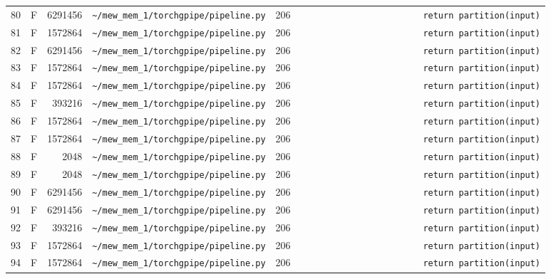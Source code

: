 \documentclass{article}
\begin{document}
\begin{longtable}{r l r p{6.5cm} r p{7.0cm}}
80 & F & 6291456 & \lstinline|~/mew_mem_1/torchgpipe/pipeline.py| & 206 & \lstinline|                        return partition(input)| \\
81 & F & 1572864 & \lstinline|~/mew_mem_1/torchgpipe/pipeline.py| & 206 & \lstinline|                        return partition(input)| \\
82 & F & 6291456 & \lstinline|~/mew_mem_1/torchgpipe/pipeline.py| & 206 & \lstinline|                        return partition(input)| \\
83 & F & 1572864 & \lstinline|~/mew_mem_1/torchgpipe/pipeline.py| & 206 & \lstinline|                        return partition(input)| \\
84 & F & 1572864 & \lstinline|~/mew_mem_1/torchgpipe/pipeline.py| & 206 & \lstinline|                        return partition(input)| \\
85 & F & 393216 & \lstinline|~/mew_mem_1/torchgpipe/pipeline.py| & 206 & \lstinline|                        return partition(input)| \\
86 & F & 1572864 & \lstinline|~/mew_mem_1/torchgpipe/pipeline.py| & 206 & \lstinline|                        return partition(input)| \\
87 & F & 1572864 & \lstinline|~/mew_mem_1/torchgpipe/pipeline.py| & 206 & \lstinline|                        return partition(input)| \\
88 & F & 2048 & \lstinline|~/mew_mem_1/torchgpipe/pipeline.py| & 206 & \lstinline|                        return partition(input)| \\
89 & F & 2048 & \lstinline|~/mew_mem_1/torchgpipe/pipeline.py| & 206 & \lstinline|                        return partition(input)| \\
90 & F & 6291456 & \lstinline|~/mew_mem_1/torchgpipe/pipeline.py| & 206 & \lstinline|                        return partition(input)| \\
91 & F & 6291456 & \lstinline|~/mew_mem_1/torchgpipe/pipeline.py| & 206 & \lstinline|                        return partition(input)| \\
92 & F & 393216 & \lstinline|~/mew_mem_1/torchgpipe/pipeline.py| & 206 & \lstinline|                        return partition(input)| \\
93 & F & 1572864 & \lstinline|~/mew_mem_1/torchgpipe/pipeline.py| & 206 & \lstinline|                        return partition(input)| \\
94 & F & 1572864 & \lstinline|~/mew_mem_1/torchgpipe/pipeline.py| & 206 & \lstinline|                        return partition(input)| \\

\end{longtable}
\end{document}
